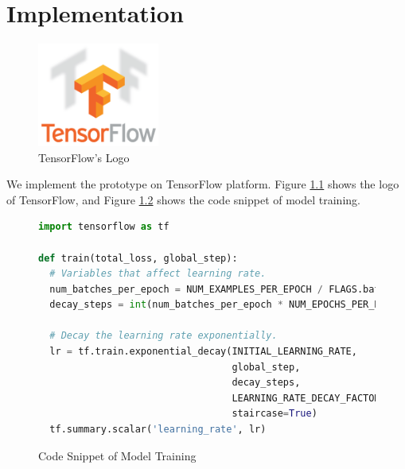 \chapter{Implementation} \label{chapter:implementation}

\begin{figure}[h!]
\centering
\includegraphics[width=4cm,keepaspectratio]{figures/tensorflow.png}
\caption{TensorFlow's Logo}
\label{figure:tensorflow_logo}
\end{figure}

We implement the prototype on TensorFlow\cite{tensorflow} platform. Figure \ref{figure:tensorflow_logo} shows the logo of TensorFlow, and Figure \ref{figure:code_snippet_of_model_training} shows the code snippet of model training.

\begin{figure}[h!]
\begin{lstlisting}[language=python]
import tensorflow as tf

def train(total_loss, global_step):
  # Variables that affect learning rate.
  num_batches_per_epoch = NUM_EXAMPLES_PER_EPOCH / FLAGS.batch_size
  decay_steps = int(num_batches_per_epoch * NUM_EPOCHS_PER_DECAY)

  # Decay the learning rate exponentially.
  lr = tf.train.exponential_decay(INITIAL_LEARNING_RATE,
                                  global_step,
                                  decay_steps,
                                  LEARNING_RATE_DECAY_FACTOR,
                                  staircase=True)
  tf.summary.scalar('learning_rate', lr)
\end{lstlisting}
\caption{Code Snippet of Model Training}
\label{figure:code_snippet_of_model_training}
\end{figure}